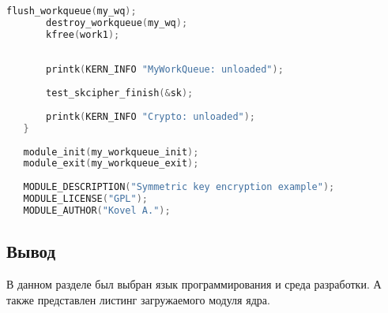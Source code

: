 \begin{lstlisting}[language=c, label=rudakov-menya-ne-spaset, caption=Загружаемый модуль ядра]
       flush_workqueue(my_wq);
       destroy_workqueue(my_wq);
       kfree(work1);
   
       
       printk(KERN_INFO "MyWorkQueue: unloaded");
   
       test_skcipher_finish(&sk);
   
       printk(KERN_INFO "Crypto: unloaded");
   }
    
   module_init(my_workqueue_init);
   module_exit(my_workqueue_exit);
    
   MODULE_DESCRIPTION("Symmetric key encryption example");
   MODULE_LICENSE("GPL");
   MODULE_AUTHOR("Kovel A.");    
\end{lstlisting}

\subsection{Вывод}

В данном разделе был выбран язык программирования и среда разработки.
А также представлен листинг загружаемого модуля ядра.